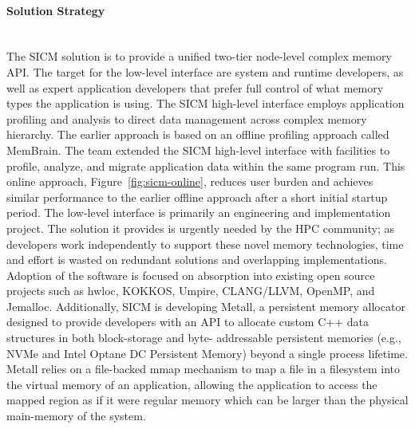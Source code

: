 \paragraph{Solution Strategy} \leavevmode \\
The SICM solution is to provide a unified two-tier node-level complex memory API. The target for the low-level interface are system and runtime developers, as well as expert application developers that prefer full control of what memory types the application is using. 
The SICM high-level interface employs application profiling and analysis to direct data management across complex memory hierarchy. The earlier approach is based on an offline profiling approach called MemBrain. The team extended the SICM high-level interface with facilities to profile, analyze, and migrate application data within the same program run. This online approach, Figure~\ref{fig:sicm-online}, reduces user burden and achieves similar performance to the earlier offline approach after a short initial startup period.
The low-level interface is primarily an engineering and implementation project. The solution it provides is urgently needed by the HPC community; as developers work independently to support these novel memory technologies, time and effort is wasted on redundant solutions and overlapping implementations. Adoption of the software is focused on absorption into existing open source projects such as hwloc, KOKKOS, Umpire, CLANG/LLVM, OpenMP, and Jemalloc.
Additionally, SICM is developing Metall, a persistent memory allocator designed to provide developers with an API to allocate custom C++ data structures in both block-storage and byte- addressable persistent memories (e.g., NVMe and Intel Optane DC Persistent Memory) beyond a single process lifetime. Metall relies on a file-backed mmap mechanism to map a file in a filesystem into the virtual memory of an application, allowing the application to access the mapped region as if it were regular memory which can be larger than the physical main-memory of the system.

